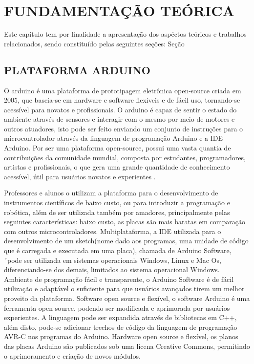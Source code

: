 
\chapter{FUNDAMENTAÇÃO TEÓRICA}
\label{chap:fundamentacao-teorica}Este capítulo tem por finalidade a apresentação dos aspéctos teóricos e trabalhos relacionados, sendo constituído pelas seguintes seções: Seção 

\section{PLATAFORMA ARDUINO}
\label{sec:arduino} O arduino é uma plataforma de prototipagem eletrônica open-source criada em 2005, que baseia-se em hardware e software flexíveis e de fácil uso, tornando-se acessível para novatos e profissionais. O arduino é capaz de sentir o estado do ambiente através de sensores e interagir com o mesmo por meio de motores e outros atuadores, isto pode ser feito enviando um conjunto de instruções para o microcontrolador através da linguagem de programação Arduino e a IDE Arduino. Por ser uma plataforma open-source, possui uma vasta quantia de contribuições da comunidade mundial, composta por estudantes, programadores, artistas e profissionais, o que gera uma grande quantidade de conhecimento acessível, útil para usuários novatos e experientes \cite{arduino2018}.

Professores e alunos o utilizam a plataforma para o desenvolvimento de instrumentos científicos de baixo custo, ou para introduzir a programação e robótica, além de ser utilizada também por amadores, principalmente pelas seguintes características: baixo custo, as placas são mais baratas em comparação com outros microcontroladores. Multiplataforma, a IDE utilizada para o desenvolvimento de um sketch(nome dado aos programas, uma unidade de código que é carregada e executada em uma placa), chamada de Arduino Software, ´pode ser utilizada em sistemas operacionais Windows, Linux e Mac Os, diferenciando-se dos demais, limitados ao sistema operacional Windows. Ambiente de programação fácil e transparente, o Arduino Software é de fácil utilização e adaptável o suficiente para que usuários avançados tirem um melhor proveito da plataforma. Software open source e flexível, o software Arduino é uma ferramenta open source, podendo ser modificada e aprimorada por usuários experientes. A linguagem pode ser expandida através de bibliotecas em C++, além disto, pode-se adicionar trechos de código da linguagem de programação AVR-C nos programas do Arduino. Hardware open source e flexível, os planos das placas Arduino são publicados sob uma licena Creative Commons, permitindo o aprimoramento e criação de novos módulos.\cite{arduino2018}

